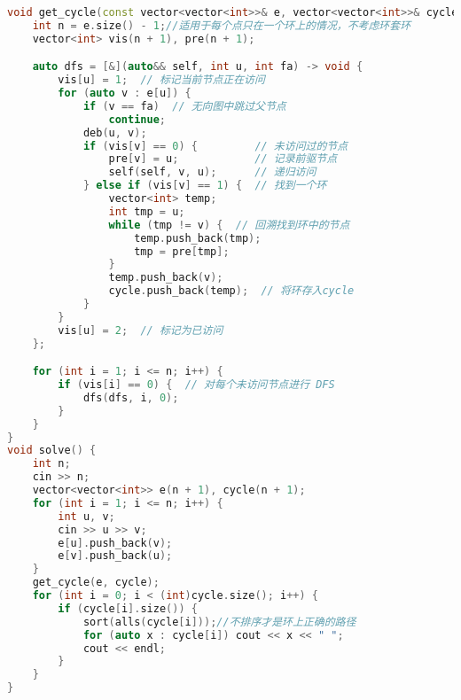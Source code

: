 \begin{lstlisting}[language=C++]
void get_cycle(const vector<vector<int>>& e, vector<vector<int>>& cycle) {
    int n = e.size() - 1;//适用于每个点只在一个环上的情况，不考虑环套环
    vector<int> vis(n + 1), pre(n + 1);

    auto dfs = [&](auto&& self, int u, int fa) -> void {
        vis[u] = 1;  // 标记当前节点正在访问
        for (auto v : e[u]) {
            if (v == fa)  // 无向图中跳过父节点
                continue;
            deb(u, v);
            if (vis[v] == 0) {         // 未访问过的节点
                pre[v] = u;            // 记录前驱节点
                self(self, v, u);      // 递归访问
            } else if (vis[v] == 1) {  // 找到一个环
                vector<int> temp;
                int tmp = u;
                while (tmp != v) {  // 回溯找到环中的节点
                    temp.push_back(tmp);
                    tmp = pre[tmp];
                }
                temp.push_back(v);
                cycle.push_back(temp);  // 将环存入cycle
            }
        }
        vis[u] = 2;  // 标记为已访问
    };

    for (int i = 1; i <= n; i++) {
        if (vis[i] == 0) {  // 对每个未访问节点进行 DFS
            dfs(dfs, i, 0);
        }
    }
}
void solve() {
    int n;
    cin >> n;
    vector<vector<int>> e(n + 1), cycle(n + 1);
    for (int i = 1; i <= n; i++) {
        int u, v;
        cin >> u >> v;
        e[u].push_back(v);
        e[v].push_back(u);
    }
    get_cycle(e, cycle);
    for (int i = 0; i < (int)cycle.size(); i++) {
        if (cycle[i].size()) {
            sort(alls(cycle[i]));//不排序才是环上正确的路径
            for (auto x : cycle[i]) cout << x << " ";
            cout << endl;
        }
    }
}
\end{lstlisting}
